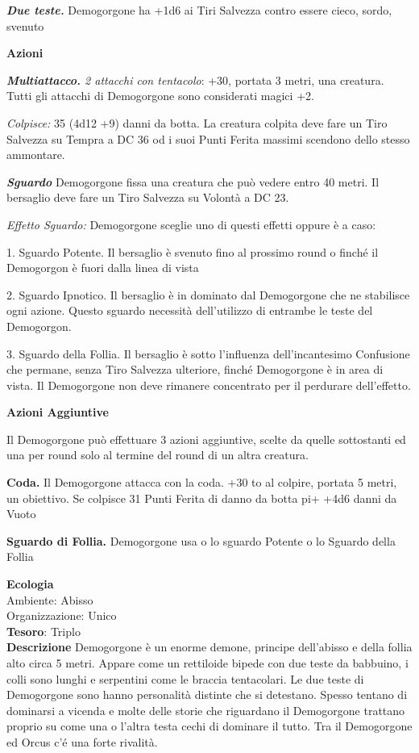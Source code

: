 \begin{multicols}{2}
	\textit{\textbf{Due teste.}} Demogorgone ha +1d6 ai Tiri Salvezza contro essere cieco, sordo, svenuto

	\textbf{Azioni}

	\textit{\textbf{Multiattacco.} 2 attacchi con tentacolo}: +30, portata 3 metri, una creatura. Tutti gli attacchi di Demogorgone sono considerati magici +2.

	\textit{Colpisce:} 35 (4d12 +9) danni da botta. La creatura colpita deve fare un Tiro Salvezza su Tempra a DC 36 od i suoi Punti Ferita massimi scendono dello stesso ammontare.

	\textit{\textbf{Sguardo}} Demogorgone fissa una creatura che può vedere entro 40 metri. Il bersaglio deve fare un Tiro Salvezza su Volontà a DC 23.

	\textit{Effetto Sguardo:} Demogorgone sceglie uno di questi effetti oppure è a caso:

	1. Sguardo Potente. Il bersaglio è svenuto fino al prossimo round o finché il Demogorgon è fuori dalla linea di vista

	2. Sguardo Ipnotico. Il bersaglio è in dominato dal Demogorgone che ne stabilisce ogni azione. Questo sguardo necessità dell'utilizzo di entrambe le teste del Demogorgon.

	3. Sguardo della Follia. Il bersaglio è sotto l'influenza dell'incantesimo Confusione che permane, senza Tiro Salvezza ulteriore, finché Demogorgone è in area di vista. Il Demogorgone non deve rimanere concentrato per il perdurare dell'effetto.

	\textbf{Azioni Aggiuntive}

	Il Demogorgone può effettuare 3 azioni aggiuntive, scelte da quelle sottostanti ed una per round solo al termine del round di un altra creatura.

	\textbf{Coda.} Il Demogorgone attacca con la coda. +30 to al colpire, portata 5 metri, un obiettivo. Se colpisce 31 Punti Ferita di danno da botta pi+ +4d6 danni da Vuoto

	\textbf{Sguardo di Follia.} Demogorgone usa o lo sguardo Potente o lo Sguardo della Follia

	\textbf{Ecologia}\\
	Ambiente: Abisso\\
	Organizzazione: Unico\\
	\textbf{Tesoro}: Triplo\\

	\textbf{Descrizione}
	Demogorgone è un enorme demone, principe dell'abisso e della follia alto circa 5 metri. Appare come un rettiloide bipede con due teste da babbuino, i colli sono lunghi e serpentini come le braccia tentacolari. Le due teste di Demogorgone sono hanno personalità distinte che si detestano. Spesso tentano di dominarsi a vicenda e molte delle storie che riguardano il Demogorgone trattano proprio su come una o l'altra testa cechi di dominare il tutto. Tra il Demogorgone ed Orcus c'é una forte rivalità.



\end{multicols}
